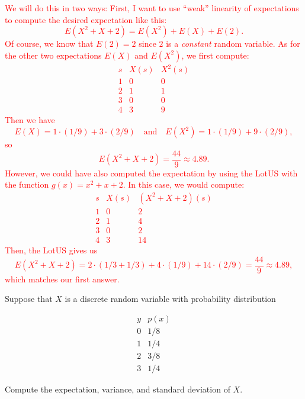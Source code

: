 \documentclass[12pt,reqno]{amsart}
\begin{document}
\bigskip
\textcolor{red}{We will do this in two ways: First, I want to use ``weak'' linearity of expectations to compute the desired expectation like this:
    \[E(X^2 + X + 2) = E(X^2) + E(X) + E(2).\]
Of course, we know that $E(2)=2$ since $2$ is a \textit{constant} random variable. As for the other two expectations $E(X)$ and $E(X^2)$, we first compute:
    \[\begin{array}{c|cc}
        s & X(s) & X^2(s)  \\ \hline
        1 & 0 & 0  \\
        2 & 1 & 1  \\
        3 & 0 & 0 \\
        4 & 3 & 9
    \end{array}\]
Then we have
    \[E(X) = 1\cdot (1/9) + 3\cdot(2/9) \quad \text{and} \quad E(X^2) = 1 \cdot (1/9) + 9 \cdot (2/9),\]
so
    \[E(X^2 + X +2) = \frac{44}{9} \approx 4.89.\]
However, we could have also computed the expectation by using the LotUS with the function $g(x) = x^2 + x + 2$. In this case, we would compute:
    \[\begin{array}{c|cc}
        s & X(s) & (X^2 + X +2)(s)  \\ \hline
        1 & 0 & 2  \\
        2 & 1 & 4  \\
        3 & 0 & 2 \\
        4 & 3 & 14
    \end{array}\]
Then, the LotUS gives us
    \[E(X^2 + X + 2) = 2\cdot (1/3 + 1/3) + 4\cdot (1/9) + 14\cdot (2/9) = \frac{44}{9} \approx 4.89,\]
which matches our first answer.}















\bigskip
\prob Suppose that $X$ is a discrete random variable with probability distribution

    \[\begin{array}{c|c}
        y & p(x) \\ \hline
        0 & 1/8   \\
        1 & 1/4   \\
        2 & 3/8  \\
        3 & 1/4 
    \end{array}\]

Compute the expectation, variance, and standard deviation of $X$.
\end{document}
